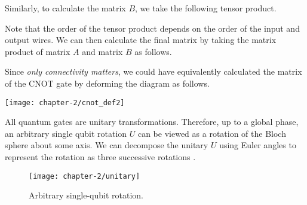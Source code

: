 Similarly, to calculate the matrix $B$, we take the following tensor product.


Note that the order of the tensor product depends on the order of the input and output wires. We can then calculate the final matrix by taking the matrix product of matrix $A$ and matrix $B$ as follows.


Since \textit{only connectivity matters}, we could have equivalently calculated the matrix of the CNOT gate by deforming the diagram as follows.

\begin{center}
    \texttt{[image: chapter-2/cnot\_def2]}
\end{center}

All quantum gates are unitary transformations. Therefore, up to a global phase, an arbitrary single qubit rotation $U$ can be viewed as a rotation of the Bloch sphere about some axis. We can decompose the unitary $U$ using Euler angles to represent the rotation as three successive rotations \cite{Wetering2020}.
\begin{figure}[H]
    \centering
    \texttt{[image: chapter-2/unitary]}
    \caption{Arbitrary single-qubit rotation.}
\end{figure}

